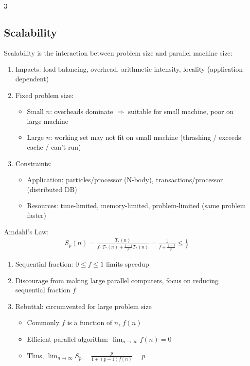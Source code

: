 \documentclass[12pt, a4paper]{article}
\begin{document}
\begin{multicols*}{3}
\colbreak
\subsection{Scalability}
Scalability is the interaction between problem size and parallel machine size:
\begin{enumerate}[\roman*.]
  \item Impacts: load balancing, overhead, arithmetic intensity, locality (application dependent)
  \item Fixed problem size:
    \begin{itemize}[leftmargin=*]\vspace{3pt}
      \item Small $n$: overheads dominate $\Rightarrow$ suitable for small machine, poor on large machine
      \item Large $n$: working set may not fit on small machine (thrashing / exceeds cache / can't run)
    \end{itemize}
  \item Constraints:
    \begin{itemize}[leftmargin=*]
      \item Application: particles/processor (N-body), transactions/processor (distributed DB) 
      \item Resources: time-limited, memory-limited, problem-limited (same problem faster)
    \end{itemize}
\end{enumerate}

Amdahl's Law:
\begin{gather*}
  S_p(n) = \frac{T_*(n)}{f \cdot T_*(n) + \frac{1-f}{p}T_*(n)}
        = \frac{1}{f + \frac{1-f}{p}}
        \le \frac{1}{f}
\end{gather*}
\begin{enumerate}[\roman*.]
  \item Sequential fraction: $0 \leq f \leq 1$ limits speedup
  \item Discourage from making large parallel computers, focus on reducing sequential fraction $f$
  \item Rebuttal: circumvented for large problem size 
    \begin{itemize}[leftmargin=*]\vspace{3pt}
      \item Commonly $f$ is a function of $n$, $f(n)$
      \item Efficient parallel algorithm: $\lim_{n\rightarrow\infty} f(n)=0$
      \item Thus, $\lim_{n\rightarrow\infty}S_p = \frac{p}{1 + (p-1)f(n)} = p$ 
    \end{itemize}
\end{enumerate}


\end{multicols*}
\end{document}
